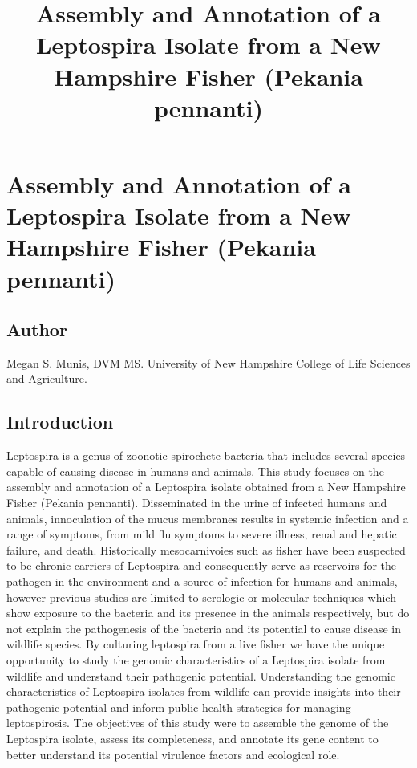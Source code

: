 \documentclass[
  letterpaper,
  DIV=11,
  numbers=noendperiod]{scrartcl}
\title{Assembly and Annotation of a Leptospira Isolate from a New
Hampshire Fisher (Pekania pennanti)}
\author{}
\date{}
\begin{document}
\maketitle


\section{Assembly and Annotation of a Leptospira Isolate from a New
Hampshire Fisher (Pekania
pennanti)}\label{assembly-and-annotation-of-a-leptospira-isolate-from-a-new-hampshire-fisher-pekania-pennanti}

\subsection{Author}\label{author}

Megan S. Munis, DVM MS. University of New Hampshire College of Life
Sciences and Agriculture.

\subsection{Introduction}\label{introduction}

Leptospira is a genus of zoonotic spirochete bacteria that includes
several species capable of causing disease in humans and animals. This
study focuses on the assembly and annotation of a Leptospira isolate
obtained from a New Hampshire Fisher (Pekania pennanti). Disseminated in
the urine of infected humans and animals, innoculation of the mucus
membranes results in systemic infection and a range of symptoms, from
mild flu symptoms to severe illness, renal and hepatic failure, and
death. Historically mesocarnivoies such as fisher have been suspected to
be chronic carriers of Leptospira and consequently serve as reservoirs
for the pathogen in the environment and a source of infection for humans
and animals, however previous studies are limited to serologic or
molecular techniques which show exposure to the bacteria and its
presence in the animals respectively, but do not explain the
pathogenesis of the bacteria and its potential to cause disease in
wildlife species. By culturing leptospira from a live fisher we have the
unique opportunity to study the genomic characteristics of a Leptospira
isolate from wildlife and understand their pathogenic potential.
Understanding the genomic characteristics of Leptospira isolates from
wildlife can provide insights into their pathogenic potential and inform
public health strategies for managing leptospirosis. The objectives of
this study were to assemble the genome of the Leptospira isolate, assess
its completeness, and annotate its gene content to better understand its
potential virulence factors and ecological role.
\end{document}
